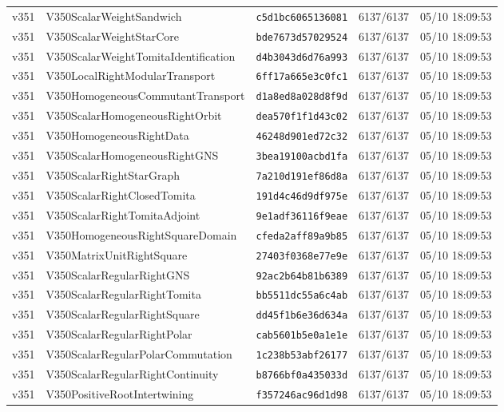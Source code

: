 \documentclass[11pt]{article}
\theoremstyle{definition}\newtheorem{deriv}{Derivation}
\begin{document}
{\begin{longtable}{@{}lllll@{}}
v351 & V350ScalarWeightSandwich & \texttt{c5d1bc6065136081} & 6137/6137 & 05/10 18:09:53 \\
v351 & V350ScalarWeightStarCore & \texttt{bde7673d57029524} & 6137/6137 & 05/10 18:09:53 \\
v351 & V350ScalarWeightTomitaIdentification & \texttt{d4b3043d6d76a993} & 6137/6137 & 05/10 18:09:53 \\
v351 & V350LocalRightModularTransport & \texttt{6ff17a665e3c0fc1} & 6137/6137 & 05/10 18:09:53 \\
v351 & V350HomogeneousCommutantTransport & \texttt{d1a8ed8a028d8f9d} & 6137/6137 & 05/10 18:09:53 \\
v351 & V350ScalarHomogeneousRightOrbit & \texttt{dea570f1f1d43c02} & 6137/6137 & 05/10 18:09:53 \\
v351 & V350HomogeneousRightData & \texttt{46248d901ed72c32} & 6137/6137 & 05/10 18:09:53 \\
v351 & V350ScalarHomogeneousRightGNS & \texttt{3bea19100acbd1fa} & 6137/6137 & 05/10 18:09:53 \\
v351 & V350ScalarRightStarGraph & \texttt{7a210d191ef86d8a} & 6137/6137 & 05/10 18:09:53 \\
v351 & V350ScalarRightClosedTomita & \texttt{191d4c46d9df975e} & 6137/6137 & 05/10 18:09:53 \\
v351 & V350ScalarRightTomitaAdjoint & \texttt{9e1adf36116f9eae} & 6137/6137 & 05/10 18:09:53 \\
v351 & V350HomogeneousRightSquareDomain & \texttt{cfeda2aff89a9b85} & 6137/6137 & 05/10 18:09:53 \\
v351 & V350MatrixUnitRightSquare & \texttt{27403f0368e77e9e} & 6137/6137 & 05/10 18:09:53 \\
v351 & V350ScalarRegularRightGNS & \texttt{92ac2b64b81b6389} & 6137/6137 & 05/10 18:09:53 \\
v351 & V350ScalarRegularRightTomita & \texttt{bb5511dc55a6c4ab} & 6137/6137 & 05/10 18:09:53 \\
v351 & V350ScalarRegularRightSquare & \texttt{dd45f1b6e36d634a} & 6137/6137 & 05/10 18:09:53 \\
v351 & V350ScalarRegularRightPolar & \texttt{cab5601b5e0a1e1e} & 6137/6137 & 05/10 18:09:53 \\
v351 & V350ScalarRegularPolarCommutation & \texttt{1c238b53abf26177} & 6137/6137 & 05/10 18:09:53 \\
v351 & V350ScalarRegularRightContinuity & \texttt{b8766bf0a435033d} & 6137/6137 & 05/10 18:09:53 \\
v351 & V350PositiveRootIntertwining & \texttt{f357246ac96d1d98} & 6137/6137 & 05/10 18:09:53 \\

\end{longtable}}
\end{document}

